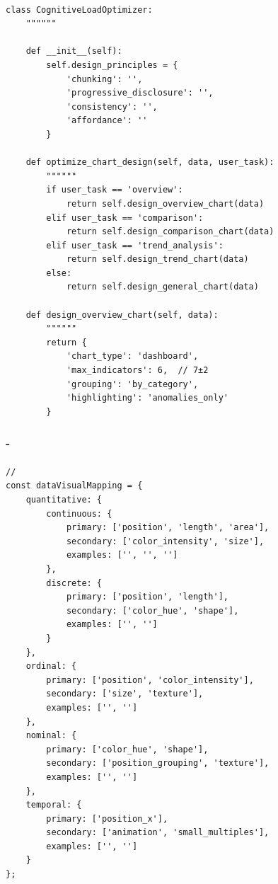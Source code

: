\hypertarget{section-108}{%
\paragraph{}\label{section-108}}

\begin{lstlisting}[style=python]
class CognitiveLoadOptimizer:
    """"""
    
    def __init__(self):
        self.design_principles = {
            'chunking': '',
            'progressive_disclosure': '',
            'consistency': '',
            'affordance': ''
        }
    
    def optimize_chart_design(self, data, user_task):
        """"""
        if user_task == 'overview':
            return self.design_overview_chart(data)
        elif user_task == 'comparison':
            return self.design_comparison_chart(data)
        elif user_task == 'trend_analysis':
            return self.design_trend_chart(data)
        else:
            return self.design_general_chart(data)
    
    def design_overview_chart(self, data):
        """"""
        return {
            'chart_type': 'dashboard',
            'max_indicators': 6,  // 7±2
            'grouping': 'by_category',
            'highlighting': 'anomalies_only'
        }
\end{lstlisting}

\hypertarget{section-109}{%
\subsubsection{-}\label{section-109}}

\hypertarget{section-110}{%
\paragraph{}\label{section-110}}

\begin{lstlisting}[style=javascript]
// 
const dataVisualMapping = {
    quantitative: {
        continuous: {
            primary: ['position', 'length', 'area'],
            secondary: ['color_intensity', 'size'],
            examples: ['', '', '']
        },
        discrete: {
            primary: ['position', 'length'],
            secondary: ['color_hue', 'shape'],
            examples: ['', '']
        }
    },
    ordinal: {
        primary: ['position', 'color_intensity'],
        secondary: ['size', 'texture'],
        examples: ['', '']
    },
    nominal: {
        primary: ['color_hue', 'shape'],
        secondary: ['position_grouping', 'texture'],
        examples: ['', '']
    },
    temporal: {
        primary: ['position_x'],
        secondary: ['animation', 'small_multiples'],
        examples: ['', '']
    }
};
\end{lstlisting}


